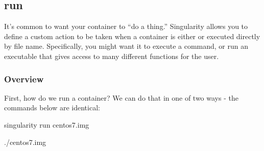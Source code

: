 \documentclass[letterpaper,10pt,english]{sphinxmanual}
\begin{document}
\begin{sphinxVerbatim}[commandchars=\\\{\}]
 

 

 

    
\end{sphinxVerbatim}


\subsection{run}
\label{\detokenize{appendix:id33}}\label{\detokenize{appendix:sec-run}}
It’s common to want your container to “do a thing.” Singularity  allows
you to define a custom action to be taken when a container is either  or
executed directly by file name. Specifically, you might want it to
execute a command, or run an executable that gives access to many
different functions for the user.


\subsubsection{Overview}
\label{\detokenize{appendix:id34}}
First, how do we run a container? We can do that in one of two ways -
the commands below are identical:

%
\begin{sphinxVerbatim}[commandchars=\\\{\}]
\PYGZdl{} singularity run centos7.img

\PYGZdl{} ./centos7.img
\end{sphinxVerbatim}
\end{document}
